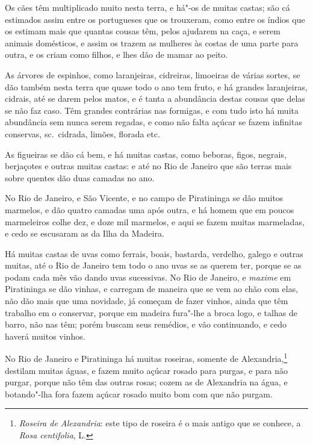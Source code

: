 \begin{linenumbers}
 Os cães têm multiplicado muito nesta terra, e há"-os de
muitas castas; são cá estimados assim entre os portugueses que os
trouxeram, como entre os índios que os estimam mais que quantas cousas
têm, pelos ajudarem na caça, e serem animais domésticos, e assim os
trazem as mulheres às costas de uma parte para outra, e os criam como
filhos, e lhes dão de mamar ao peito. 

 As árvores de espinhos, como laranjeiras, cidreiras,
limoeiras de várias sortes, se dão também nesta terra que quase todo o
ano tem fruto, e há grandes laranjeiras, cidrais, até se darem pelos
matos, e é tanta a abundância destas cousas que delas se não faz caso.
Têm grandes contrárias nas formigas, e com tudo isto há muita
abundância sem nunca serem regadas, e como não falta açúcar se fazem
infinitas conservas, sc.~cidrada, limões, florada etc.

 As figueiras se dão cá bem, e há muitas castas,
como beboras, figos, negrais, berjaçotes e outras muitas castas: e até
no Rio de Janeiro que são terras mais sobre quentes dão duas camadas no ano.

 No Rio de Janeiro, e São Vicente, e no campo de
Piratininga se dão muitos marmelos, e dão quatro camadas uma após
outra, e há homem que em poucos marmeleiros colhe dez, e doze mil
marmelos, e aqui se fazem muitas marmeladas, e cedo se escusaram as da
Ilha da Madeira.

 Há muitas castas de uvas como ferrais, boais,
bastarda, verdelho, galego e outras muitas, até o Rio de Janeiro tem
todo o ano uvas se as querem ter, porque se as podam cada mês vão dando
uvas sucessivas. No Rio de Janeiro, e \textit{maxime} em Piratininga se dão
vinhas, e carregam de maneira que se vem ao chão com elas, não dão mais
que uma novidade, já começam de fazer vinhos, ainda que têm trabalho em
o conservar, porque em madeira fura"-lhe a broca logo, e talhas de
barro, não nas têm; porém buscam seus remédios, e vão continuando, e
cedo haverá muitos vinhos.

 No Rio de Janeiro e Piratininga há muitas roseiras,
somente de Alexandria,\footnote{ \textit{Roseira de Alexandria}: este
tipo de roseira é o mais antigo que se conhece, a \textit{Rosa
centifolia}, L.} destilam muitas águas, e fazem muito açúcar rosado
para purgas, e para não purgar, porque não têm das outras rosas; cozem
as de Alexandria na água, e botando"-lha fora fazem açúcar rosado muito
bom com que não purgam.


\end{linenumbers}
